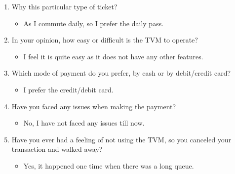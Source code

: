 \documentclass[15pt]{article}
\begin{document}
\begin{appendices}
\begin{enumerate}[leftmargin=3em, itemsep=0pt, parsep=0pt, , font=\Large\bfseries]
\begin{enumerate}[leftmargin=2em, itemsep=0pt, parsep=0pt, , font=\Large\bfseries]
            \vspace{0.2cm}
        \item {\Large Why this particular type of ticket?}
        \vspace{0.1cm}
            \begin{itemize}
                \item {\Large As I commute daily, so I prefer the daily pass.}
            \end{itemize}
            \vspace{0.2cm}
        \item {\Large In your opinion, how easy or difficult is the TVM to operate?}
        \vspace{0.1cm}
            \begin{itemize}
                \item {\Large I feel it is quite easy as it does not have any other features.}
            \end{itemize}
            \vspace{0.2cm}
        \item {\Large Which mode of payment do you prefer, by cash or by debit/credit card?}
            \begin{itemize}
                \item {\Large I prefer the credit/debit card.}
            \end{itemize}
            \vspace{0.2cm}
        \item {\Large Have you faced any issues when making the payment?}
        \vspace{0.1cm}
            \begin{itemize}
                \item {\Large No, I have not faced any issues till now.}
            \end{itemize}
            \vspace{0.2cm}
        \item {\Large Have you ever had a feeling of not using the TVM, so you canceled your transaction and walked away?}
        \vspace{0.1cm}
            \begin{itemize}
                \item {\Large Yes, it happened one time when there was a long queue.}
            \end{itemize}
            \vspace{0.2cm}
    \end{enumerate}
    

\end{enumerate}
\end{appendices}
\end{document}
